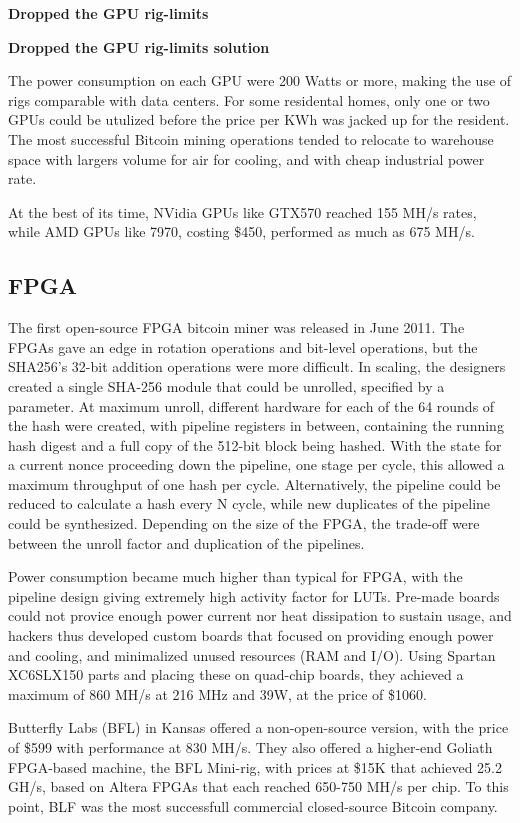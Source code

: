 \textbf{Dropped the GPU rig-limits}

\textbf{Dropped the GPU rig-limits solution}

The power consumption on each GPU were 200 Watts or more, making the use of rigs comparable with data centers.
For some residental homes, only one or two GPUs could be utulized before the price per KWh was jacked up for the resident.
The most successful Bitcoin mining operations tended to relocate to warehouse space with largers volume for air for cooling, and with cheap industrial power rate.

At the best of its time, NVidia GPUs like GTX570 reached 155 MH/s rates, while AMD GPUs like 7970, costing \$450, performed as much as 675 MH/s.\cite{bespoke-silicon}

\subsection{FPGA}
The first open-source FPGA bitcoin miner was released in June 2011.
The FPGAs gave an edge in rotation operations and bit-level operations, but the SHA256's 32-bit addition operations were more difficult.
In scaling, the designers created a single SHA-256 module that could be unrolled, specified by a parameter.
At maximum unroll, different hardware for each of the 64 rounds of the hash were created, with pipeline registers in between, containing the running hash digest and a full copy of the 512-bit block being hashed.
With the state for a current nonce proceeding down the pipeline, one stage per cycle, this allowed a maximum throughput of one hash per cycle.
Alternatively, the pipeline could be reduced to calculate a hash every N cycle, while new duplicates of the pipeline could be synthesized.
Depending on the size of the FPGA, the trade-off were between the unroll factor and duplication of the pipelines.

Power consumption became much higher than typical for FPGA, with the pipeline design giving extremely high activity factor for LUTs.
Pre-made boards could not provice enough power current nor heat dissipation to sustain usage, and hackers thus developed custom boards that focused on providing enough power and cooling, and minimalized unused resources (RAM and I/O).
Using Spartan XC6SLX150 parts and placing these on quad-chip boards, they achieved a maximum of 860 MH/s at 216 MHz and 39W, at the price of \$1060.

Butterfly Labs (BFL) in Kansas offered a non-open-source version, with the price of \$599 with performance at 830 MH/s.
They also offered a higher-end Goliath FPGA-based machine, the BFL Mini-rig, with prices at \$15K that achieved 25.2 GH/s, based on Altera FPGAs that each reached 650-750 MH/s per chip.
To this point, BLF was the most successfull commercial closed-source Bitcoin company.

